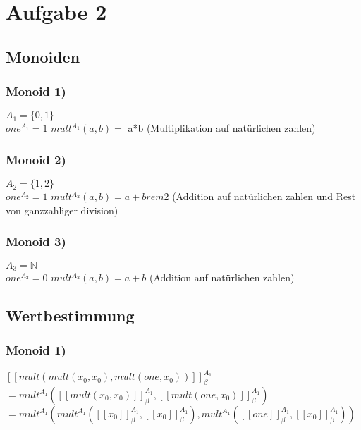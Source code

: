 \section*{Aufgabe 2}

\subsection*{Monoiden}
\subsubsection*{Monoid 1)}

$A_1 = \{ 0 , 1 \}$\\
$one^{A_1} = 1$ $mult^{A_1}(a,b)= $ a*b (Multiplikation auf natürlichen zahlen)\\

\subsubsection*{Monoid 2)}

$A_2 = \{ 1 , 2 \}$\\
$one^{A_2} = 1$ $mult^{A_2}(a,b)= a+b rem 2 $ (Addition auf natürlichen zahlen und Rest von ganzzahliger division)\\

\subsubsection*{Monoid 3)}

$A_3 = \mathbb{N}$\\
$one^{A_2} = 0$ $mult^{A_2}(a,b)= a+b $ (Addition auf natürlichen zahlen)\\

\subsection*{Wertbestimmung}
\subsubsection*{Monoid 1)}

$[[mult(mult(x_0 ,x_0), mult(one,x_0 )) ]]^{A_1}_{\beta}$\\

$= mult^{A_1}([[mult(x_0 ,x_0)]]^{A_1}_{\beta}, [[mult(one,x_0 ) ]]^{A_1}_{\beta})$\\

$= mult^{A_1}(
mult^{A_1}(
[[x_0 ]]^{A_1}_{\beta} , [[x_0 ]]^{A_1}_{\beta}
), mult^{A_1}( 
[[one]]^{A_1}_{\beta} , [[x_0]]^{A_1}_{\beta} )) $\\

